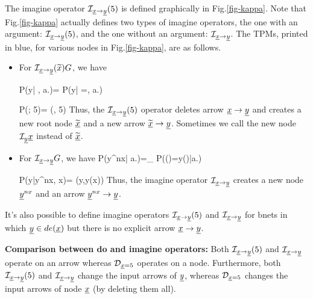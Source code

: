 The imagine operator  $\cali_{\rvx\rarrow \rvy}(5)$
is defined graphically in Fig.\ref{fig-kappa}.
Note that Fig.\ref{fig-kappa}
actually defines two types
of imagine operators, the one
with an argument:
$\cali_{\rvx\rarrow \rvy}(5)$,
and the one without an argument:
$\cali_{\rvx\rarrow \rvy}$.
The TPMs, printed in blue,
for various nodes in
Fig.\ref{fig-kappa}, are as follows.



\begin{itemize}

\item
For $\cali_{\rvx\rarrow
\rvy}(\TIL{x})G$, we have

\beq\color{blue}
P(y| , a.)=
P(y| \rvx=, a.)
\eeq

\beq\color{blue}
P(; 5)=
\delta(, 5)
\eeq
Thus, the $\cali_{\rvx\rarrow\rvy}(5)$ operator 
deletes
arrow $\rvx\rarrow\rvy$
and
creates a new root node
$\TIL{\rvx}$
and a new arrow
$\TIL{\rvx}\rarrow \rvy$.
Sometimes we call
the new node
$\cali_\rvy\rvx$
instead of
 $\TIL{\rvx}$.

\item
For $\cali_{\rvx\rarrow \rvy}G$, we have
\beq\color{blue}
P(y^{nx}| a.)=\prod_{}
P(\rvy()=y()|a.)
\eeq

\beq\color{blue}
P(y|y^{nx}, x)=
\delta(y,y(x))
\eeq
Thus, the imagine operator 
$\cali_{\rvx\rarrow\rvy}$
creates
a new node $\rvy^{nx}$
and an arrow $\rvy^{nx}\rarrow \rvy$.

\end{itemize}

It's also possible to define
imagine operators $\cali_{\rvx\rarrow\rvy}(5)$
and $\cali_{\rvx\rarrow\rvy}$ for bnets
in which $\rvy\in de(\rvx)$
but there is no
explicit arrow $\rvx\rarrow \rvy$.


{\bf Comparison between do and imagine
operators:} Both
$\cali_{\rvx\rarrow\rvy}(5)$
and $\cali_{\rvx\rarrow\rvy}$
operate on an arrow
whereas 
$\cald_{\rvx=5}$
 operates on a node.
Furthermore, both $\cali_{\rvx\rarrow\rvy}(5)$
and $\cali_{\rvx\rarrow\rvy}$
change the input arrows of $\rvy$,
whereas $\cald_{\rvx=5}$
changes the input arrows of node $\rvx$ (by deleting them all).






